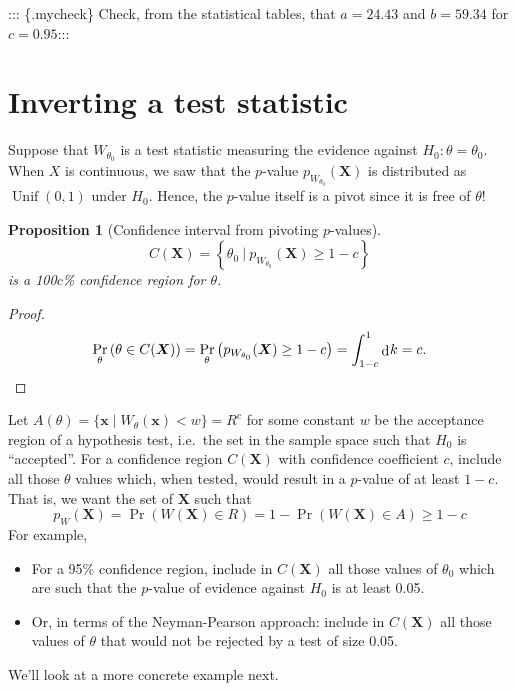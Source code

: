 \documentclass[
]{book}
\newcommand{\bx}{{\boldsymbol x}}
\newcommand{\bX}{{\boldsymbol X}}
\DeclareMathOperator{\Unif}{Unif}
\DeclareMathOperator{\dd}{d}
\newcommand{\dint}{\dd\hspace{0.5pt}\!}
\newtheorem{proposition}{Proposition}[chapter]
\theoremstyle{definition}
\theoremstyle{definition}
\theoremstyle{definition}
\theoremstyle{definition}
\theoremstyle{remark}
\begin{document}
::: \{.mycheck\}
Check, from the statistical tables, that \(a=24.43\) and \(b=59.34\) for \(c=0.95\):::

\hypertarget{inverting-a-test-statistic}{%
\section{Inverting a test statistic}\label{inverting-a-test-statistic}}

Suppose that \(W_{\theta_0}\) is a test statistic measuring the evidence against \(H_0:\theta = \theta_0\). When \(X\) is continuous, we saw that the \(p\)-value \(p_{W_{\theta_0}}(\bX)\) is distributed as \(\Unif(0,1)\) under \(H_0\). Hence, the \(p\)-value itself is a pivot since it is free of \(\theta\)!

\begin{proposition}[Confidence interval from pivoting \(p\)-values]
\protect\hypertarget{prp:pvalci}{}\label{prp:pvalci}\[
C(\bX) = \left\{\theta_0 \ \Big| \ p_{W_{\theta_0}}(\bX) \geq 1 - c \right\}
\]
is a 100\(c\)\% confidence region for \(\theta\).
\end{proposition}

\begin{proof}
\[
\Pr_\theta \left(\theta \in C(\bX) \right) = \Pr_\theta \left(p_{W_{\theta_0}}(\bX) \geq 1 - c \right) = \int_{1-c}^1 \dint k = c.
\]
\end{proof}

Let \(A(\theta)=\{ \bx \mid W_\theta(\bx) < w\} = R^c\) for some constant \(w\) be the acceptance region of a hypothesis test, i.e.~the set in the sample space such that \(H_0\) is ``accepted''.
For a confidence region \(C(\bX)\) with confidence coefficient \(c\), include all those \(\theta\) values which, when tested, would result in a \(p\)-value of at least \(1-c\).
That is, we want the set of \(\bX\) such that
\[
p_W(\bX) = \Pr(W(\bX)\in R) = 1-\Pr(W(\bX) \in A) \geq 1-c
\]
For example,

\begin{itemize}
\item
  For a 95\% confidence region, include in \(C(\bX)\) all those values of \(\theta_0\) which are such that the \(p\)-value of evidence against \(H_0\) is at least 0.05.
\item
  Or, in terms of the Neyman-Pearson approach: include in \(C(\bX)\) all those values of \(\theta\) that would not be rejected by a test of size 0.05.
\end{itemize}

We'll look at a more concrete example next.
\end{document}

